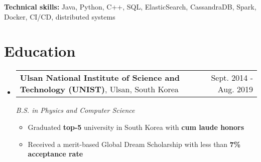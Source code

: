\documentclass[letterpaper,11pt]{article}
\makeatletter
\newcommand{\resumeItem}[1]{
    \item\small{
            {#1 \vspace{-2pt}}
    }
}
\newcommand{\resumeSubheading}[4]{
    \vspace{-5pt}\item
    \begin{tabularx}{0.97\textwidth}[t]{l@{\extracolsep{\fill}}r}
    \textbf{#1}, #4 & #2 \\
    \end{tabularx}
    \textit{\small#3} \\
    \vspace{-5pt}
}
\newcommand{\resumeSubHeadingListStart}{\begin{itemize}[leftmargin=0.15in, label={}]}
\newcommand{\resumeSubHeadingListEnd}{\end{itemize}}
\newcommand{\resumeItemListStart}{\begin{itemize}}
\newcommand{\resumeItemListEnd}{\end{itemize}\vspace{-5pt}}
\makeatother
\begin{document}
\hspace*{7pt}
\small{\textbf{Technical skills:} Java, Python, C++, SQL, ElasticSearch, CassandraDB, Spark, Docker, CI/CD, distributed systems}
\vspace{-6pt}

\section{Education}
\resumeSubHeadingListStart
\resumeSubheading
{Ulsan National Institute of Science and Technology (UNIST)}{Sept. 2014 - Aug. 2019}
{B.S. in Physics and Computer Science}{Ulsan, South Korea}
\resumeItemListStart
\resumeItem{Graduated \textbf{top-5} university in South Korea with \textbf{cum laude honors}}
\resumeItem{Received a merit-based Global Dream Scholarship with less than \textbf{7\% acceptance rate}}
\resumeItemListEnd
\vspace{-6pt}
\resumeSubHeadingListEnd

\end{document}
